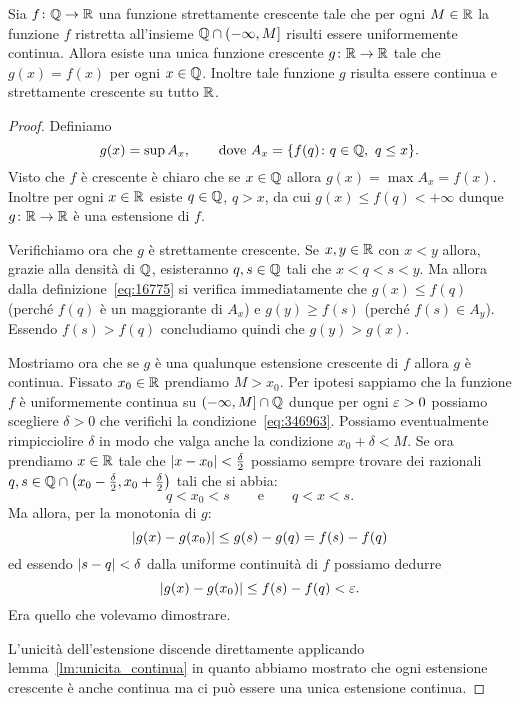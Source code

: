 \begin{lemma}
\label{lm:estensione_monotona}%
Sia $f\colon \mathbb Q\to \mathbb R$ una funzione
strettamente crescente
tale che per ogni $M\in \mathbb R$ la funzione
$f$ ristretta all'insieme
$\mathbb Q \cap (-\infty,M]$ risulti essere uniformemente
continua.
Allora esiste una unica funzione crescente
$g\colon \mathbb R\to\mathbb R$
tale che $g(x)=f(x)$ per ogni $x\in \mathbb Q$.
Inoltre tale funzione $g$ risulta essere continua
e strettamente crescente su tutto $\mathbb R$.
\end{lemma}
%
\begin{proof}
Definiamo
\begin{equation}\label{eq:16775}
  g(x) = \sup A_x,
  \qquad \text{dove }
  A_x = {\left\{ f(q)\colon q\in \mathbb Q,\ q\le x \right\}}.
\end{equation}
Visto che $f$ è crescente è chiaro che se $x\in\mathbb Q$
allora $g(x) = \max A_x = f(x)$. Inoltre per ogni $x\in \mathbb R$
esiste $q\in \mathbb Q$, $q>x$, da cui
$g(x)\le f(q)<+\infty$
dunque $g\colon \mathbb R\to\mathbb R$ è una estensione di $f$.

Verifichiamo ora che $g$ è strettamente crescente.
Se $x,y\in \mathbb R$ con $x<y$ allora,
grazie alla densità di $\mathbb Q$,
esisteranno $q,s\in \mathbb Q$ tali che $x<q<s<y$.
Ma allora dalla definizione~\eqref{eq:16775}
si verifica immediatamente che $g(x)\le f(q)$
(perché $f(q)$ è un maggiorante di $A_x$)
e $g(y)\ge f(s)$ (perché $f(s)\in A_y$).
Essendo $f(s)>f(q)$
concludiamo quindi che $g(y)> g(x)$.

Mostriamo ora che se $g$ è una qualunque
estensione crescente di $f$ allora $g$
è continua.
Fissato $x_0\in \mathbb R$ prendiamo $M>x_0$.
Per ipotesi sappiamo che la funzione $f$
è uniformemente continua su $(-\infty,M]\cap \mathbb Q$
dunque per ogni $\varepsilon>0$ possiamo
scegliere $\delta>0$
che verifichi la condizione~\eqref{eq:346963}.
Possiamo eventualmente rimpicciolire $\delta$
in modo che valga anche la condizione $x_0+\delta < M$.
Se ora prendiamo $x\in \mathbb R$ tale che ${\left|x-x_0\right|}<\frac\delta 2$
possiamo sempre trovare dei razionali $q,s\in \mathbb Q\cap{\left( x_0-\frac \delta 2,x_0+\frac \delta 2 \right)}$
tali che si abbia:
\[
  q < x_0 < s
  \qquad \text{e}\qquad
  q < x < s.
\]
Ma allora, per la monotonia di $g$:
\[
  {\left|g(x)-g(x_0)\right|} \le g(s)-g(q) = f(s)-f(q)
\]
ed essendo ${\left|s-q\right|} < \delta$ dalla uniforme
continuità di $f$ possiamo dedurre
\[
  {\left|g(x)-g(x_0)\right|} \le f(s)-f(q) < \varepsilon.
\]
Era quello che volevamo dimostrare.

L'unicità dell'estensione discende direttamente
applicando lemma~\ref{lm:unicita_continua}
in quanto abbiamo mostrato che
ogni estensione crescente è anche continua
ma ci può essere una unica estensione continua.
\end{proof}

